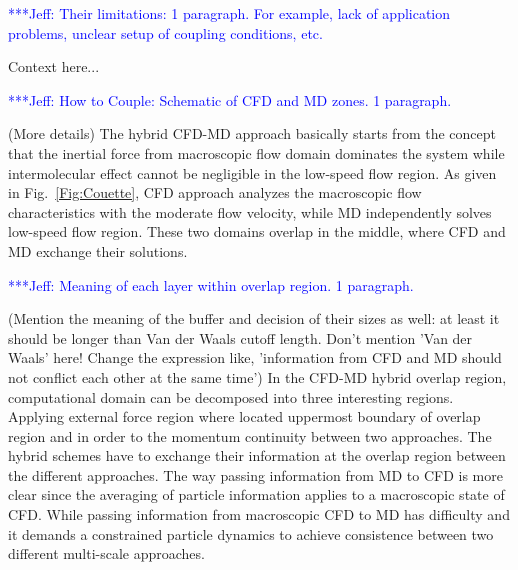 \documentclass[conference,final]{IEEEtran}
\newcommand{\skonote}[1]{ {\textcolor{blue} { ***Jeff: #1 }}}
\newcommand{\skonote}[1]{}
\begin{document}
\skonote{Their limitations: 1 paragraph. For example, lack of application problems, unclear setup of coupling conditions, etc.}

Context here...
\newline

\skonote{How to Couple: Schematic of CFD and MD zones. 1 paragraph.}

(More details)
The hybrid CFD-MD approach basically starts from the concept that the inertial force from macroscopic flow domain dominates the system while intermolecular effect cannot be negligible in the low-speed flow region. As given in Fig.~\ref{Fig:Couette}, CFD approach analyzes the macroscopic flow characteristics with the moderate flow velocity, while MD independently solves low-speed flow region. These two domains overlap in the middle, where CFD and MD exchange their solutions.
\newline

\skonote{Meaning of each layer within overlap region. 1 paragraph.}

(Mention the meaning of the buffer and decision of their sizes as well: at least it should be longer than Van der Waals cutoff length. Don't mention 'Van der Waals' here! Change the expression like, 'information from CFD and MD should not conflict each other at the same time')
In the CFD-MD hybrid overlap region, computational domain can be decomposed into three interesting regions. Applying external force region where located uppermost boundary of overlap region and in order to the momentum continuity between two approaches. The hybrid schemes have to exchange their information at the overlap region between the different approaches. The way passing information from MD to CFD is more clear since the averaging of particle information applies to a macroscopic state of CFD. While passing information from macroscopic CFD to MD has difficulty and it demands a constrained particle dynamics to achieve consistence between two different multi-scale approaches.
\newline
\end{document}
